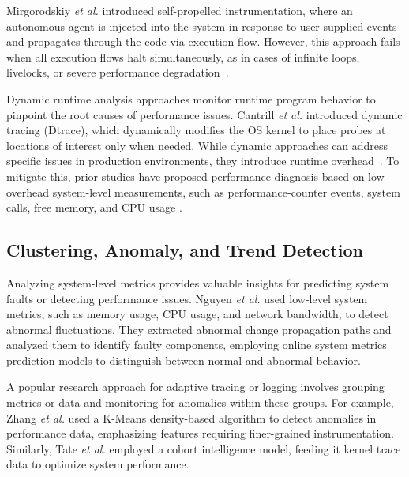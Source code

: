 \documentclass[pdflatex,sn-nature]{sn-jnl}%
\theoremstyle{thmstyleone}%
\theoremstyle{thmstyletwo}%
\theoremstyle{thmstylethree}%
\begin{document}
Mirgorodskiy \textit{et al.} \cite{mirgorodskiy2006automated} introduced self-propelled instrumentation, where an autonomous agent is injected into the system in response to user-supplied events and propagates through the code via execution flow. However, this approach fails when all execution flows halt simultaneously, as in cases of infinite loops, livelocks, or severe performance degradation~\cite{jin2012understanding}.

Dynamic runtime analysis approaches \cite{arulraj2013production,dean2014perfscope} monitor runtime program behavior to pinpoint the root causes of performance issues. Cantrill \textit{et al.} \cite{cantrill2004dynamic} introduced dynamic tracing (Dtrace), which dynamically modifies the OS kernel to place probes at locations of interest only when needed. While dynamic approaches can address specific issues in production environments, they introduce runtime overhead~\cite{arulraj2013production,dean2014perfscope}.  To mitigate this, prior studies have proposed performance diagnosis based on low-overhead system-level measurements, such as performance-counter events, system calls, free memory, and CPU usage \cite{arulraj2013production,dean2014perfscope}.


\subsection{Clustering, Anomaly, and Trend Detection}

Analyzing system-level metrics provides valuable insights for predicting system faults or detecting performance issues. Nguyen \textit{et al.} \cite{nguyen2013fchain} used low-level system metrics, such as memory usage, CPU usage, and network bandwidth, to detect abnormal fluctuations. They extracted abnormal change propagation paths and analyzed them to identify faulty components, employing online system metrics prediction models to distinguish between normal and abnormal behavior.

A popular research approach for adaptive tracing or logging involves grouping metrics or data and monitoring for anomalies within these groups. For example, Zhang \textit{et al.} \cite{zhang2020diagnostic} used a K-Means density-based algorithm to detect anomalies in performance data, emphasizing features requiring finer-grained instrumentation. Similarly, Tate \textit{et al.} \cite{tate2017optimization} employed a cohort intelligence model, feeding it kernel trace data to optimize system performance.
\end{document}

